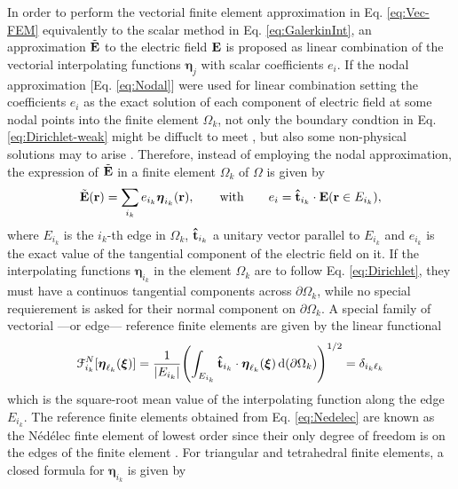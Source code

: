 
 In order to perform the vectorial finite element approximation in Eq. \eqref{eq:Vec-FEM} equivalently to the scalar method in Eq. \eqref{eq:GalerkinInt}, an approximation $\tilde{\vb{E}}$ to the electric field $\vb{E}$ is proposed as linear combination of the vectorial interpolating functions $\boldsymbol{\eta}_j$ with scalar coefficients $e_i$. If the nodal approximation [Eq. \eqref{eq:Nodal}] were used for linear combination setting the coefficients $e_i$ as the exact solution of each component of  electric field at some nodal points into the finite element $\Omega_k$, not only the boundary condtion in Eq. \eqref{eq:Dirichlet-weak} might be diffuclt to meet \cite{larson_finite_2013,jin_theory_2010}, but also  some non-physical solutions may to arise \cite{bondeson_computational_2005}. Therefore, instead of employing the nodal approximation, the expression of $\tilde{\vb{E}}$ in a finite element $\Omega_k$ of $\Omega$ is given by \cite{larson_finite_2013}
%
\begin{align}
    \tilde{\vb{E}}(\vb{r}) = \sum_{i_k} e_{i_k} \boldsymbol{\eta}_{i_k}(\vb{r}),
        \qquad
        \text{with}
        \qquad
    e_{i} = \vu{t}_{i_k}\cdot \vb{E}(\vb{r}\in E_{i_k}),
\end{align}
%
where $E_{i_k}$ is the ${i_k}$-th edge in $\Omega_k$, $\vu{t}_{i_k}$ a unitary vector  parallel to $E_{i_k}$ and $e_{i_k}$ is the exact value of the tangential component of the electric field on it. If the interpolating functions  $\boldsymbol{\eta}_{i_k}$ in the element $\Omega_k$ are to follow Eq. \eqref{eq:Dirichlet}, they  must have a continuos tangential components across $\partial\Omega_k$, while no special requierement is asked for their normal component on $\partial\Omega_k$. A special family of vectorial ---or edge--- reference finite elements are given by the linear functional \cite{larson_finite_2013}
%
\begin{align}
    \mathcal{F}^{N}_{i_k}[\boldsymbol{\eta}_{\ell_k}(\boldsymbol{\xi})] = \frac{1}{\abs{E_{i_k}}}\qty(\int_{E_{i_k}} \vu{t}_{i_k}\cdot\boldsymbol{\eta}_{\ell_k}(\boldsymbol{\xi})   \dd{(\partial\Omega_k)} )^{1/2}  = \delta_{{i_k}{\ell_k}}
    \label{eq:Nedelec}
\end{align}
%
which is the square-root mean value of the interpolating function along the edge $E_{i_k}$. The reference finite elements obtained from Eq. \eqref{eq:Nedelec} are known as the Nédélec finte element of lowest order since their only degree of freedom is on the edges of the finite element \cite{bergot_generation_2010}. For triangular and tetrahedral finite elements, a closed formula for $\boldsymbol{\eta}_{i_k}$ is given by \cite{jin_theory_2010,larson_finite_2013,bondeson_computational_2005}
